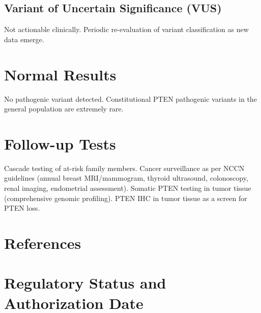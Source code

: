 \subsection*{Variant of Uncertain Significance (VUS)}
Not actionable clinically. Periodic re-evaluation of variant classification as new data emerge.

\section*{Normal Results}
No pathogenic variant detected. Constitutional PTEN pathogenic variants in the general population are extremely rare.

\section*{Follow-up Tests}
Cascade testing of at-risk family members. Cancer surveillance as per NCCN guidelines (annual breast MRI/mammogram, thyroid ultrasound, colonoscopy, renal imaging, endometrial assessment). Somatic PTEN testing in tumor tissue (comprehensive genomic profiling). PTEN IHC in tumor tissue as a screen for PTEN loss.

\section*{References}



\clearpage
\section*{Regulatory Status and Authorization Date}

\clearpage
